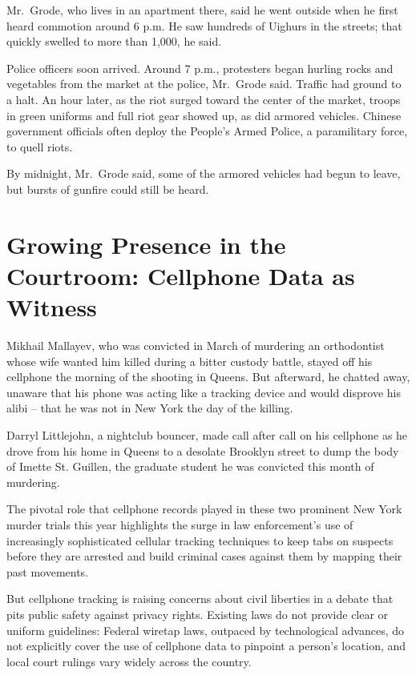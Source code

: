 ﻿\documentclass[12pt]{article}
\begin{document}
Mr.~Grode, who lives in an apartment there, said he went outside when he first heard commotion
around 6 p.m. He saw hundreds of Uighurs in the streets; that quickly swelled to more than 1,000, he
said.

Police officers soon arrived. Around 7 p.m., protesters began hurling rocks and vegetables from the
market at the police, Mr.~Grode said. Traffic had ground to a halt. An hour later, as the riot
surged toward the center of the market, troops in green uniforms and full riot gear showed up, as
did armored vehicles. Chinese government officials often deploy the People's Armed Police, a
paramilitary force, to quell riots.

By midnight, Mr.~Grode said, some of the armored vehicles had begun to leave, but bursts of gunfire
could still be heard.

\section{Growing Presence in the Courtroom: Cellphone Data as Witness}

Mikhail Mallayev, who was convicted in March of murdering an orthodontist whose wife wanted him
killed during a bitter custody battle, stayed off his cellphone the morning of the shooting in
Queens. But afterward, he chatted away, unaware that his phone was acting like a tracking device and
would disprove his alibi -- that he was not in New York the day of the killing.

Darryl Littlejohn, a nightclub bouncer, made call after call on his cellphone as he drove from his
home in Queens to a desolate Brooklyn street to dump the body of Imette St. Guillen, the graduate
student he was convicted this month of murdering.

The pivotal role that cellphone records played in these two prominent New York murder trials this
year highlights the surge in law enforcement's use of increasingly sophisticated cellular tracking
techniques to keep tabs on suspects before they are arrested and build criminal cases against them
by mapping their past movements.

But cellphone tracking is raising concerns about civil liberties in a debate that pits public safety
against privacy rights. Existing laws do not provide clear or uniform guidelines: Federal wiretap
laws, outpaced by technological advances, do not explicitly cover the use of cellphone data to
pinpoint a person's location, and local court rulings vary widely across the country.
\end{document}
